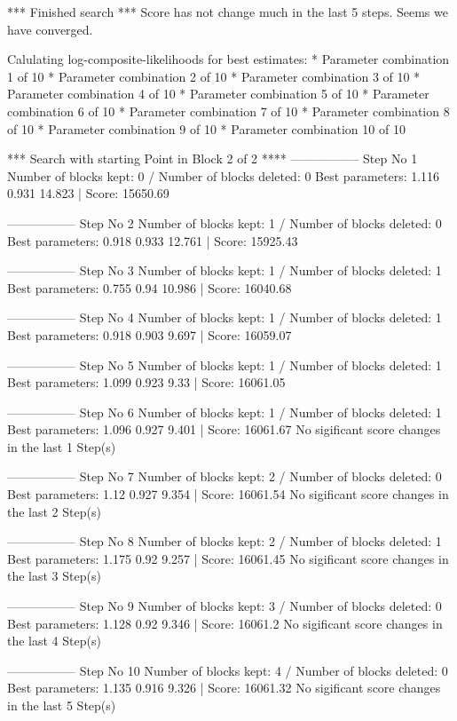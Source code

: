 \begin{Schunk}
\begin{Soutput}
*** Finished search *** 
Score has not change much in the last 5 steps. 
Seems we have converged. 

Calulating log-composite-likelihoods for best estimates: 
* Parameter combination 1 of 10 
* Parameter combination 2 of 10 
* Parameter combination 3 of 10 
* Parameter combination 4 of 10 
* Parameter combination 5 of 10 
* Parameter combination 6 of 10 
* Parameter combination 7 of 10 
* Parameter combination 8 of 10 
* Parameter combination 9 of 10 
* Parameter combination 10 of 10 

*** Search with starting Point in Block 2 of 2 **** 
----------------- 
Step No 1 
Number of blocks kept: 0  / Number of blocks deleted: 0 
Best parameters:  1.116 0.931 14.823 | Score: 15650.69 

----------------- 
Step No 2 
Number of blocks kept: 1  / Number of blocks deleted: 0 
Best parameters:  0.918 0.933 12.761 | Score: 15925.43 

----------------- 
Step No 3 
Number of blocks kept: 1  / Number of blocks deleted: 1 
Best parameters:  0.755 0.94 10.986 | Score: 16040.68 

----------------- 
Step No 4 
Number of blocks kept: 1  / Number of blocks deleted: 1 
Best parameters:  0.918 0.903 9.697 | Score: 16059.07 

----------------- 
Step No 5 
Number of blocks kept: 1  / Number of blocks deleted: 1 
Best parameters:  1.099 0.923 9.33 | Score: 16061.05 

----------------- 
Step No 6 
Number of blocks kept: 1  / Number of blocks deleted: 1 
Best parameters:  1.096 0.927 9.401 | Score: 16061.67 
No sigificant score changes in the last 1 Step(s) 

----------------- 
Step No 7 
Number of blocks kept: 2  / Number of blocks deleted: 0 
Best parameters:  1.12 0.927 9.354 | Score: 16061.54 
No sigificant score changes in the last 2 Step(s) 

----------------- 
Step No 8 
Number of blocks kept: 2  / Number of blocks deleted: 1 
Best parameters:  1.175 0.92 9.257 | Score: 16061.45 
No sigificant score changes in the last 3 Step(s) 

----------------- 
Step No 9 
Number of blocks kept: 3  / Number of blocks deleted: 0 
Best parameters:  1.128 0.92 9.346 | Score: 16061.2 
No sigificant score changes in the last 4 Step(s) 

----------------- 
Step No 10 
Number of blocks kept: 4  / Number of blocks deleted: 0 
Best parameters:  1.135 0.916 9.326 | Score: 16061.32 
No sigificant score changes in the last 5 Step(s) 


\end{Soutput}
\end{Schunk}
